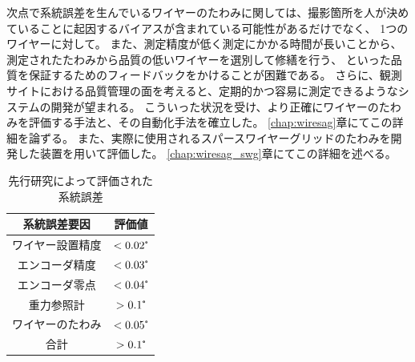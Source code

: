 \documentclass[../../main.tex]{subfiles}
\begin{document}
次点で系統誤差を生んでいるワイヤーのたわみに関しては、撮影箇所を人が決めていることに起因するバイアスが含まれている可能性があるだけでなく、
1つのワイヤーに対して。
また、測定精度が低く測定にかかる時間が長いことから、測定されたたわみから品質の低いワイヤーを選別して修繕を行う、
といった品質を保証するためのフィードバックをかけることが困難である。
さらに、観測サイトにおける品質管理の面を考えると、定期的かつ容易に測定できるようなシステムの開発が望まれる。
こういった状況を受け、より正確にワイヤーのたわみを評価する手法と、その自動化手法を確立した。
\ref{chap:wiresag}章にてこの詳細を論ずる。
また、実際に使用されるスパースワイヤーグリッドのたわみを開発した装置を用いて評価した。
\ref{chap:wiresag_swg}章にてこの詳細を述べる。
\begin{table}[H]
    \centering
    \caption{先行研究によって評価された系統誤差}
    \begin{tabular}{|c|c|}
        \hline
        系統誤差要因 & 評価値 \\
        \hline
        ワイヤー設置精度 & $< 0.02\tcdegree$ \\
        エンコーダ精度 & $<0.03\tcdegree$ \\
        エンコーダ零点 & $<0.04\tcdegree$ \\
        重力参照計 & $>0.1\tcdegree$ \\
        ワイヤーのたわみ & $<0.05\tcdegree$ \\
        \hline
        合計 & $>0.1\tcdegree$ \\
        \hline
    \end{tabular}
    \label{tab:systematic_errors_old}
\end{table}
\end{document}
